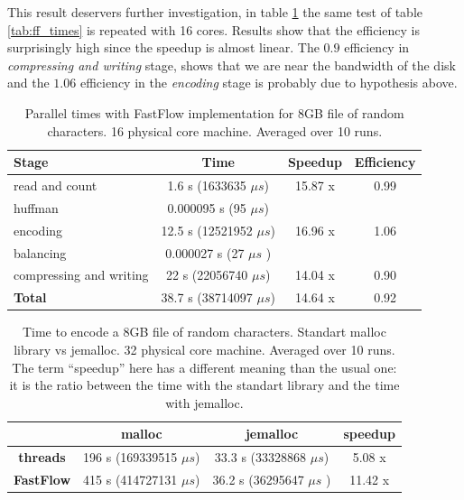 \documentclass[12pt, letterpaper]{article}
\begin{document}
This result deservers further investigation, in table \ref{tab:ff_times16} the same test of table \ref{tab:ff_times} is repeated with 16 cores. Results show that the efficiency is surprisingly high since the speedup is almost linear. The $0.9 $ efficiency in \textit{compressing and writing} stage, shows that we are near the bandwidth of the disk and the $1.06$ efficiency in the \textit{encoding} stage is probably due to hypothesis above.

\begin{table}[h]
    \begin{center}
    \begin{tabular}{l c c c}
        \textbf{Stage} & \textbf{Time} & \textbf{Speedup} & \textbf{Efficiency}  \\
        \hline
        read and count & 1.6 s (1633635 $\mu s$)  & 15.87 x & 0.99  \\
        \hline
        huffman & 0.000095 s (95 $\mu s$) & \\
        \hline
        encoding & 12.5 s (12521952 $\mu s$)  & 16.96 x & 1.06 \\
        \hline
        balancing & 0.000027 s (27 $\mu s$ ) & \\
        \hline
        compressing and writing & 22 s (22056740 $\mu s$)  & 14.04 x & 0.90\\
        \hline
        \textbf{Total} & 38.7 s (38714097 $\mu s$)  & 14.64 x & 0.92 \\ 
\end{tabular} 
\caption{Parallel times with FastFlow implementation for 8GB file of random characters. 16 physical core machine. Averaged over 10 runs.}    
\label{tab:ff_times16}
\end{center}
\end{table}



\begin{table}[!h]
    \begin{center}
    \begin{tabular}{c c c c}
        & \textbf{malloc} & \textbf{jemalloc} & speedup\\
        \hline
        \textbf{threads} & 196 s (169339515 $\mu s$)  & 33.3 s  (33328868 $\mu s$) & 5.08 x \\
        \hline
        \textbf{FastFlow} &  415 s  (414727131 $\mu s$) & 36.2 s (36295647 $\mu s$ ) & 11.42 x \\
        \hline
    \end{tabular}
\caption{Time to encode a 8GB file of random characters. Standart malloc library vs jemalloc. 32 physical core machine. Averaged over 10 runs. The term ``speedup'' here has a different meaning than the usual one: it is the ratio between the time with the standart library and the time with jemalloc.}    
\label{tab:jemalloc}
\end{center}
\end{table}
\end{document}
